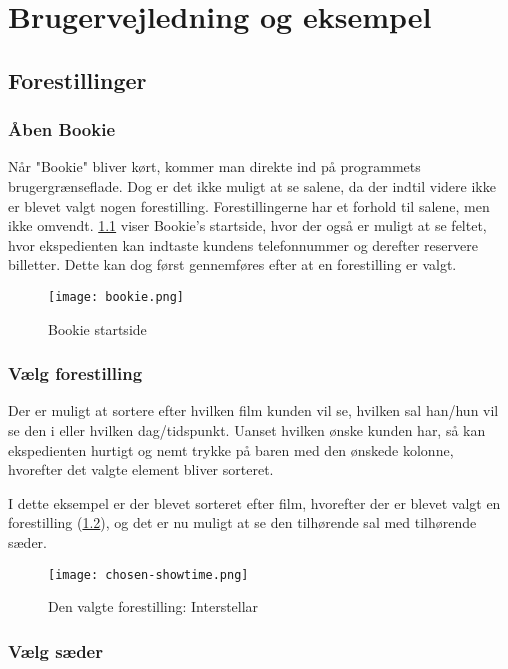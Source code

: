 \chapter{Brugervejledning og eksempel}

\section{Forestillinger}

\subsection{Åben Bookie}

Når "Bookie" bliver kørt, kommer man direkte ind på programmets brugergrænseflade. Dog er det ikke muligt at se salene, da der indtil videre ikke er blevet valgt nogen forestilling. Forestillingerne har et forhold til salene, men ikke omvendt. \ref{screenshot: bookie} viser Bookie's startside, hvor der også er muligt at se feltet, hvor ekspedienten kan indtaste kundens telefonnummer og derefter reservere billetter. Dette kan dog først gennemføres efter at en forestilling er valgt. 

\begin{figure}[h]
  \centering
  \texttt{[image: bookie.png]}
  \caption{Bookie startside}
  \label{screenshot: bookie}
\end{figure}

\subsection{Vælg forestilling}

Der er muligt at sortere efter hvilken film kunden vil se, hvilken sal han/hun vil se den i eller hvilken dag/tidspunkt. Uanset hvilken ønske kunden har, så kan ekspedienten hurtigt og nemt trykke på baren med den ønskede kolonne, hvorefter det valgte element bliver sorteret.

I dette eksempel er der blevet sorteret efter film, hvorefter der er blevet valgt en forestilling (\ref{screenshot: chosen-showtime}), og det er nu muligt at se den tilhørende sal med tilhørende sæder.

\begin{figure} [h]
  \centering
  \texttt{[image: chosen-showtime.png]}
  \caption{Den valgte forestilling: Interstellar}
  \label{screenshot: chosen-showtime}
\end{figure}

\subsection{Vælg sæder}

